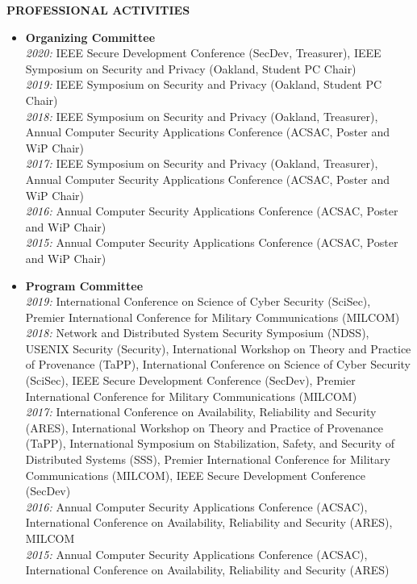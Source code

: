 \documentclass[10pt]{article}
\begin{document}
\vspace{1em} {\Large \textbf{PROFESSIONAL ACTIVITIES}}
\begin{itemize}
  \item \textbf{Organizing Committee}\\
    \textit{2020:} IEEE Secure Development Conference (SecDev, Treasurer), IEEE Symposium on Security and Privacy (Oakland, Student PC Chair)\\
    \textit{2019:} IEEE Symposium on Security and Privacy (Oakland, Student PC Chair)\\
    \textit{2018:} IEEE Symposium on Security and Privacy (Oakland, Treasurer), Annual Computer Security Applications Conference (ACSAC, Poster and WiP Chair)\\
    \textit{2017:} IEEE Symposium on Security and Privacy (Oakland, Treasurer), Annual Computer Security Applications Conference (ACSAC, Poster and WiP Chair)\\
    \textit{2016:} Annual Computer Security Applications Conference (ACSAC, Poster and WiP Chair)\\
    \textit{2015:} Annual Computer Security Applications Conference (ACSAC, Poster and WiP Chair)
  \item \textbf{Program Committee}\\
    \textit{2019:}  International Conference on Science of Cyber Security (SciSec), Premier International Conference for Military Communications (MILCOM)\\
    \textit{2018:} Network and Distributed System Security Symposium (NDSS), USENIX Security (Security), International Workshop on Theory and Practice of Provenance (TaPP), International Conference on Science of Cyber Security (SciSec), IEEE Secure Development Conference (SecDev), Premier International Conference for Military Communications (MILCOM)\\
    \textit{2017:} International Conference on Availability, Reliability and Security (ARES), International Workshop on Theory and Practice of Provenance (TaPP), International Symposium on Stabilization, Safety, and Security of Distributed Systems (SSS), Premier International Conference for Military Communications (MILCOM), IEEE Secure Development Conference (SecDev)\\
    \textit{2016:} Annual Computer Security Applications Conference (ACSAC), International Conference on Availability, Reliability and Security (ARES), MILCOM\\
    \textit{2015:} Annual Computer Security Applications Conference (ACSAC), International Conference on Availability, Reliability and Security (ARES)\\

\end{itemize}
\end{document}
